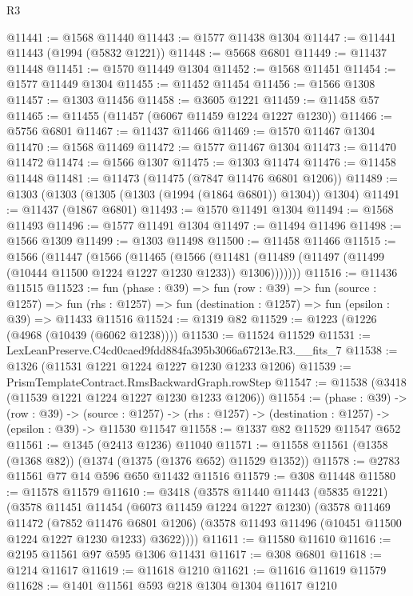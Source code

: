 \begin{lexlean}{R3}
\begin{coremodule}
@11441 := @1568 @11440
@11443 := @1577 @11438 @1304
@11447 := @11441 @11443 (@1994 (@5832 @1221))
@11448 := @5668 @6801
@11449 := @11437 @11448
@11451 := @1570 @11449 @1304
@11452 := @1568 @11451
@11454 := @1577 @11449 @1304
@11455 := @11452 @11454
@11456 := @1566 @1308
@11457 := @1303 @11456
@11458 := @3605 @1221
@11459 := @11458 @57
@11465 := @11455 (@11457 (@6067 @11459 @1224 @1227 @1230))
@11466 := @5756 @6801
@11467 := @11437 @11466
@11469 := @1570 @11467 @1304
@11470 := @1568 @11469
@11472 := @1577 @11467 @1304
@11473 := @11470 @11472
@11474 := @1566 @1307
@11475 := @1303 @11474
@11476 := @11458 @11448
@11481 := @11473 (@11475 (@7847 @11476 @6801 @1206))
@11489 := @1303 (@1303 (@1305 (@1303 (@1994 (@1864 @6801)) @1304)) @1304)
@11491 := @11437 (@1867 @6801)
@11493 := @1570 @11491 @1304
@11494 := @1568 @11493
@11496 := @1577 @11491 @1304
@11497 := @11494 @11496
@11498 := @1566 @1309
@11499 := @1303 @11498
@11500 := @11458 @11466
@11515 := @1566
    (@11447
      (@1566
        (@11465
          (@1566
            (@11481 (@11489 (@11497 (@11499 (@10444 @11500 @1224 @1227 @1230 @1233)) @1306)))))))
@11516 := @11436 @11515
@11523 := fun (phase : @39) =>
  fun (row : @39) =>
  fun (source : @1257) =>
  fun (rhs : @1257) => fun (destination : @1257) => fun (epsilon : @39) => @11433 @11516
@11524 := @1319 @82
@11529 := @1223 (@1226 (@4968 (@10439 (@6062 @1238))))
@11530 := @11524 @11529
@11531 := LexLeanPreserve.C4cd0caed9fdd884fa395b3066a67213e.R3.__fits_7
@11538 := @1326 (@11531 @1221 @1224 @1227 @1230 @1233 @1206)
@11539 := PrismTemplateContract.RmsBackwardGraph.rowStep
@11547 := @11538 (@3418 (@11539 @1221 @1224 @1227 @1230 @1233 @1206))
@11554 := (phase : @39) ->
  (row : @39) ->
  (source : @1257) -> (rhs : @1257) -> (destination : @1257) -> (epsilon : @39) -> @11530 @11547
@11558 := @1337 @82 @11529 @11547 @652
@11561 := @1345 (@2413 @1236) @11040
@11571 := @11558 @11561 (@1358 (@1368 @82)) (@1374 (@1375 (@1376 @652) @11529 @1352))
@11578 := @2783 @11561 @77 @14 @596 @650 @11432 @11516
@11579 := @308 @11448
@11580 := @11578 @11579
@11610 := @3418
    (@3578
      @11440
      @11443
      (@5835 @1221)
      (@3578
        @11451
        @11454
        (@6073 @11459 @1224 @1227 @1230)
        (@3578
          @11469
          @11472
          (@7852 @11476 @6801 @1206)
          (@3578 @11493 @11496 (@10451 @11500 @1224 @1227 @1230 @1233) @3622))))
@11611 := @11580 @11610
@11616 := @2195 @11561 @97 @595 @1306 @11431
@11617 := @308 @6801
@11618 := @1214 @11617
@11619 := @11618 @1210
@11621 := @11616 @11619 @11579
@11628 := @1401 @11561 @593 @218 @1304 @1304 @11617 @1210

\end{coremodule}
\end{lexlean}
